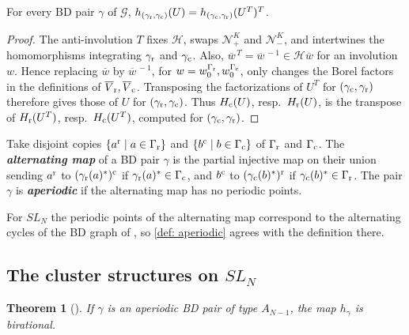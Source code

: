 \documentclass[a4paper]{amsart}
\numberwithin{equation}{section}
\newtheorem{theorem}{Theorem}[section]
\theoremstyle{definition}
\theoremstyle{remark}
\newcommand{\mcG}{\mathcal{G}}
\newcommand{\mcH}{\mathcal{H}}
\newcommand{\mcN}{\mathcal{N}}
\newcommand{\rr}{{\rm r}}
\newcommand{\cc}{{\rm c}}
\newcommand{\newword}[1]{\textbf{\emph{#1}}}
\begin{document}
\begin{lemma}
  \label{lem: h transpose}
  For every BD pair $\gamma$ of $\mcG$, $h_{(\gamma_{\rr},\gamma_{\cc})}(U)=h_{(\gamma_{\cc},\gamma_{\rr})}(U^T)^T$.
\end{lemma}
\begin{proof}
  The anti-involution $T$ fixes $\mcH$, swaps $\mcN_+^K$ and $\mcN_-^K$, and intertwines the homomorphisms integrating $\gamma_{\rr}$ and $\gamma_{\cc}$.
  Also, $\overline{w}^{\,T}=\overline{w}^{\,-1}\in\mcH\overline{w}$ for an involution $w$.
  Hence replacing $\overline{w}$ by $\overline{w}^{\,-1}$, for $w=w_0^{\Gamma_{\rr}},w_0^{\Gamma_{\cc}}$, only changes the Borel factors in the definitions of $\overline{V}_{\rr},\overline{V}_{\cc}$.
  Transposing the factorizations of $U^T$ for $(\gamma_{\cc},\gamma_{\rr})$ therefore gives those of $U$ for $(\gamma_{\rr},\gamma_{\cc})$.
  Thus $H_{\cc}(U)$, resp.\ $H_{\rr}(U)$, is the transpose of $H_{\rr}(U^T)$, resp.\ $H_{\cc}(U^T)$, computed for $(\gamma_{\cc},\gamma_{\rr})$.
\end{proof}

\begin{definition}
  \label{def: aperiodic}
  Take disjoint copies $\{a^\rr\mid a\in\Gamma_{\rr}\}$ and $\{b^\cc\mid b\in\Gamma_{\cc}\}$ of $\Gamma_{\rr}$ and $\Gamma_{\cc}$.
  The \newword{alternating map} of a BD pair $\gamma$ is the partial injective map on their union sending $a^\rr$ to $(\gamma_{\rr}(a)^*)^\cc$ if $\gamma_{\rr}(a)^*\in\Gamma_{\cc}$, and $b^\cc$ to $(\gamma_{\cc}(b)^*)^\rr$ if $\gamma_{\cc}(b)^*\in\Gamma_{\rr}$.
  The pair $\gamma$ is \newword{aperiodic} if the alternating map has no periodic points.
\end{definition}

For $SL_N$ the periodic points of the alternating map correspond to the alternating cycles of the BD graph of \cite[Section~4.1]{GSV23}, so \cref{def: aperiodic} agrees with the definition there.

\subsection{The cluster structures on \texorpdfstring{$SL_N$}{SLN}}
\label{sec: GSV}
\begin{theorem}[{\cite[Section~1, Theorem~4.4 and (4.6)]{GSV23}}]
  \label{thm: GSV h}
  If $\gamma$ is an aperiodic BD pair of type $A_{N-1}$, the map $h_\gamma$ is birational.
\end{theorem}
\end{document}

